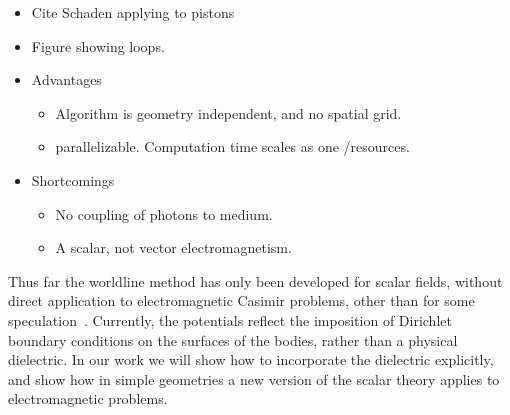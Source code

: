\begin{itemize}
\item Cite Schaden applying to pistons\cite{Schaden2009}
\item Figure showing loops.  
\item Advantages
  \begin{itemize}
  \item Algorithm is geometry independent, and no spatial grid.
  \item parallelizable.  Computation time scales as one /resources.  
  \end{itemize}

\item Shortcomings
\begin{itemize}
  \item No coupling of photons to medium.
  \item A scalar, not vector electromagnetism.
\end{itemize}
  
\end{itemize}


Thus far the worldline method has only been developed for scalar fields, without direct application to electromagnetic Casimir problems, other than for some speculation~\cite{Aehlig2011}.  Currently, the potentials reflect the imposition of Dirichlet boundary conditions on the surfaces of the bodies, rather than a physical dielectric.   In our work we will show how to incorporate the dielectric explicitly, and show how in simple geometries a new version of the scalar theory applies to electromagnetic problems.  

